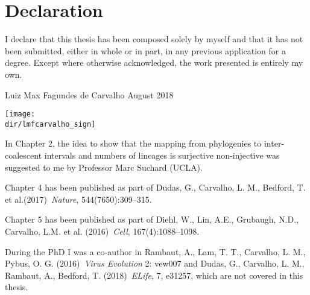 \chapter{Declaration}
\vspace*{2\baselineskip}
I declare that this thesis has been composed 
solely by myself and that it has not been submitted, either in whole or
in part, in any previous application for a degree.
Except where otherwise acknowledged, the work presented is entirely my
own.
\vspace{6\baselineskip}\\
\begin{flushright}
\hspace*{\fill}
Luiz Max Fagundes de Carvalho
\newline
August 2018

\texttt{[image: \\dir/lmfcarvalho\_sign]}

\end{flushright}
\cleardoublepage

In Chapter 2, the idea to show that the mapping from phylogenies to inter-coalescent intervals and numbers of lineages is surjective non-injective was suggested to me by Professor Marc Suchard (UCLA).

Chapter 4 has been published as part of Dudas, G., Carvalho, L. M., Bedford, T. et al.(2017)~\textit{Nature}, 544(7650):309--315.

Chapter 5 has been published as part of Diehl, W., Lin, A.E., Grubaugh, N.D., Carvalho, L.M. et al. (2016)~\textit{Cell}, 167(4):1088--1098.

During the PhD I was a co-author in Rambaut, A., Lam, T. T., Carvalho, L. M.,  Pybus, O. G. (2016)~\textit{Virus Evolution} 2: vew007 and Dudas, G., Carvalho, L. M., Rambaut, A.,  Bedford, T. (2018)~\textit{ELife}, 7, e31257, which are not covered in this thesis.
